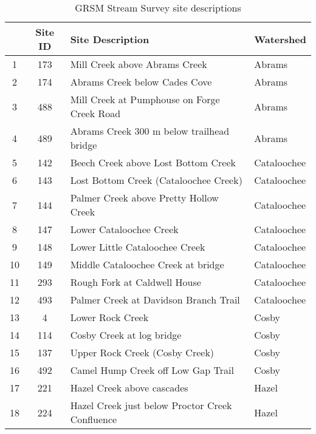 \begin{table}[h]\scriptsize
\centering
\caption{GRSM Stream Survey site descriptions}
\begin{tabular}{ccll}
\toprule
      & Site ID & Site Description                                                   &Watershed\\ 
\midrule
1   & 173       & Mill Creek above Abrams Creek                             & Abrams\\
2   & 174       & Abrams Creek below Cades Cove                         & Abrams \\ 
3   & 488       & Mill Creek at Pumphouse on Forge Creek Road     & Abrams \\ 
4   & 489       & Abrams Creek 300 m below trailhead bridge         & Abrams \\ 
5   & 142       & Beech Creek above Lost Bottom Creek                 & Cataloochee \\ 
6   & 143       & Lost Bottom Creek (Cataloochee Creek)               & Cataloochee \\ 
7   & 144       & Palmer Creek above Pretty Hollow Creek              & Cataloochee \\ 
8   & 147       & Lower Cataloochee Creek                                      & Cataloochee \\ 
9   & 148       & Lower Little Cataloochee Creek                             & Cataloochee \\ 
10 & 149       & Middle Cataloochee Creek at bridge                      & Cataloochee \\ 
11 & 293       & Rough Fork at Caldwell House                               & Cataloochee \\ 
12 & 493       & Palmer Creek at Davidson Branch Trail                  & Cataloochee \\ 
13 & 4           & Lower Rock Creek                                                  & Cosby \\ 
14 & 114       & Cosby Creek at log bridge                                     & Cosby \\ 
15 & 137       & Upper Rock Creek (Cosby Creek)                          & Cosby \\ 
16 & 492       & Camel Hump Creek off Low Gap Trail                     & Cosby \\ 
17 & 221       & Hazel Creek above cascades                                 & Hazel \\ 
18 & 224       & Hazel Creek just below Proctor Creek Confluence & Hazel \\ 

\end{tabular}
\end{table}
